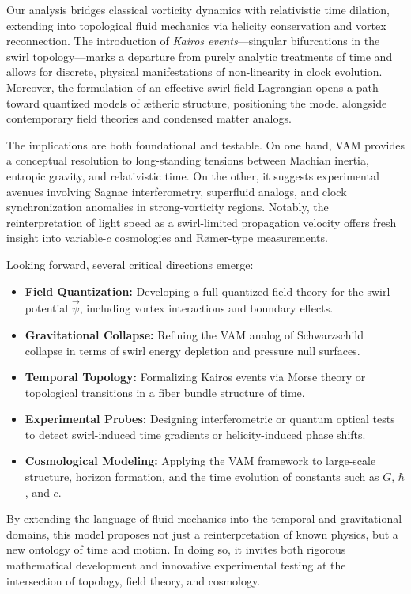\documentclass[12pt]{article}
\begin{document}
    Our analysis bridges classical vorticity dynamics with relativistic time dilation, extending into topological fluid mechanics via helicity conservation and vortex reconnection. The introduction of \emph{Kairos events}—singular bifurcations in the swirl topology—marks a departure from purely analytic treatments of time and allows for discrete, physical manifestations of non-linearity in clock evolution. Moreover, the formulation of an effective swirl field Lagrangian opens a path toward quantized models of ætheric structure, positioning the model alongside contemporary field theories and condensed matter analogs.

    The implications are both foundational and testable. On one hand, VAM provides a conceptual resolution to long-standing tensions between Machian inertia, entropic gravity, and relativistic time. On the other, it suggests experimental avenues involving Sagnac interferometry, superfluid analogs, and clock synchronization anomalies in strong-vorticity regions. Notably, the reinterpretation of light speed as a swirl-limited propagation velocity offers fresh insight into variable-\( c \) cosmologies and Rømer-type measurements.

    Looking forward, several critical directions emerge:

    \begin{itemize}
        \item \textbf{Field Quantization:} Developing a full quantized field theory for the swirl potential \( \vec{\psi} \), including vortex interactions and boundary effects.
        \item \textbf{Gravitational Collapse:} Refining the VAM analog of Schwarzschild collapse in terms of swirl energy depletion and pressure null surfaces.
        \item \textbf{Temporal Topology:} Formalizing Kairos events via Morse theory or topological transitions in a fiber bundle structure of time.
        \item \textbf{Experimental Probes:} Designing interferometric or quantum optical tests to detect swirl-induced time gradients or helicity-induced phase shifts.
        \item \textbf{Cosmological Modeling:} Applying the VAM framework to large-scale structure, horizon formation, and the time evolution of constants such as \( G \), \( \hbar \), and \( c \).
    \end{itemize}

    By extending the language of fluid mechanics into the temporal and gravitational domains, this model proposes not just a reinterpretation of known physics, but a new ontology of time and motion. In doing so, it invites both rigorous mathematical development and innovative experimental testing at the intersection of topology, field theory, and cosmology.

    \ifdefined\standalonechapter
    \else
    
    
\end{document}
